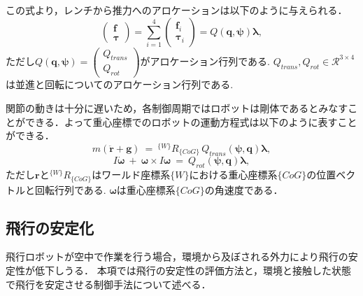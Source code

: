 \documentclass{jarticle}
\begin{document}
この式より，レンチから推力へのアロケーションは以下のように与えられる．
\begin{equation}
    \left(\begin{array}{c} \bm{f} \\ \bm{\tau} \end{array} \right) = \sum_{i=1}^{4} \left( \begin{array}{c} \bm{f}_i \\ \bm{\tau}_i \end{array} \right)
    = Q(\bm{q},\bm{\psi}) \bm{\lambda} ,
\end{equation}
ただし$Q(\bm{q},\bm{\psi}) = \left( \begin{array}{c} Q_{trans} \\ Q_{rot} \end{array}\right)$がアロケーション行列である.
$Q_{trans}, Q_{rot} \in \mathcal{R}^{3\times4}$は並進と回転についてのアロケーション行列である.

関節の動きは十分に遅いため，各制御周期ではロボットは剛体であるとみなすことができる．よって重心座標でのロボットの運動方程式は以下のように表すことができる．
\begin{equation}
    \label{equ:EOM_trans}
    m(\ddot{\bm{r}} + \bm{g}) ~=~ ^{\{W\}}R_{\{CoG\}} \, Q_{trans}(\bm{\psi},\bm{q})\bm{\lambda} ,
\end{equation}
\begin{equation}
    \label{equ:EOM_rot}
    I \dot{\bm{\omega}} ~+~ \bm{\omega} \times I \bm{\omega} ~=~ Q_{rot}(\bm{\psi},\bm{q})\bm{\lambda} ,
\end{equation}
ただし$\bm{r}$と$^{\{W\}}R_{\{CoG\}}$はワールド座標系$\{W\}$における重心座標系$\{CoG\}$の位置ベクトルと回転行列である.
$\bm{\omega}$は重心座標系$\{CoG\}$の角速度である．


\subsection{飛行の安定化}
飛行ロボットが空中で作業を行う場合，環境から及ぼされる外力により飛行の安定性が低下しうる．
本項では飛行の安定性の評価方法と，環境と接触した状態で飛行を安定させる制御手法について述べる．
\end{document}
